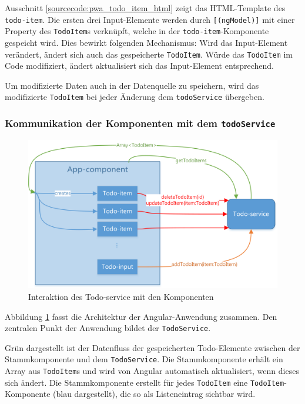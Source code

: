 \begin{description}
	Ausschnitt \ref{sourcecode:pwa_todo_item_html} zeigt das HTML-Template des \texttt{todo-item}. Die ersten drei Input-Elemente werden durch \texttt{[(ngModel)]} mit einer Property des \texttt{TodoItem}s verknüpft, welche in der \texttt{todo-item}-Komponente gespeicht wird. Dies bewirkt folgenden Mechanismus: Wird das Input-Element verändert, ändert sich auch das gespeicherte \texttt{TodoItem}. Würde das \texttt{TodoItem} im Code modifiziert, ändert aktualisiert sich das Input-Element entsprechend.
	
	Um modifizierte Daten auch in der Datenquelle zu speichern, wird das modifizierte \texttt{TodoItem} bei jeder Änderung dem \texttt{todoService} übergeben.
	
	
	
\end{description}

\subsubsection{Kommunikation der Komponenten mit dem \texttt{todoService}}
\begin{figure}[h]
	\includegraphics[width=\textwidth]{img/pwa_components.png}
	\centering
	\caption{Interaktion des Todo-service mit den Komponenten}
	\label{fig:pwa_todo_service}
\end{figure}

Abbildung \ref{fig:pwa_todo_service} fasst die Architektur der Angular-Anwendung zusammen. Den zentralen Punkt der Anwendung bildet der \texttt{TodoService}. 

Grün dargestellt ist der Datenfluss der gespeicherten Todo-Elemente zwischen der Stammkomponente und dem \texttt{TodoService}. Die Stammkomponente erhält ein Array aus \texttt{TodoItem}s und wird von Angular automatisch aktualisiert, wenn dieses sich ändert.
Die Stammkomponente erstellt für jedes \texttt{TodoItem} eine \texttt{TodoItem}-Komponente (blau dargestellt), die so als Listeneintrag sichtbar wird.

